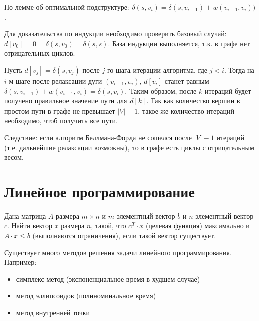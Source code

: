 \documentclass[11pt]{article}
\begin{document}
По лемме об оптимальной подструктуре: $\delta(s, v_i) = \delta(s, v_{i-1}) + w(v_{i-1}, v_i))$.

Для доказательства по индукции необходимо проверить базовый случай: $d[v_0] = 0 = \delta(s, v_0) = \delta(s, s)$. База индукции выполняется, т.к. в графе нет отрицательных циклов.

Пусть $d[v_j] = \delta(s, v_j)$ после $j$-го шага итерации алгоритма, где $j < i$. Тогда на $i$-м шаге после релаксации дуги $(v_{i-1}, v_i)$, $d[v_i]$ станет равным $\delta(s, v_{i-1}) + w(v_{i-1}, v_i) = \delta(s, v_i)$. Таким образом, после $k$ итераций будет получено правильное значение пути для $d[k]$. Так как количество вершин в простом пути в графе не превышает $|V|-1$, такое же количество итераций необходимо, чтоб получить все пути.

Следствие: если алгоритм Беллмана-Форда не сошелся после $|V|-1$ итераций (т.е. дальнейшие релаксации возможны), то в графе есть циклы с отрицательным весом.

\section{Линейное программирование}
Дана матрица $A$ размера $m \times n$ и $m$-элементный вектор $b$ и $n$-элементный вектор $c$. Найти вектор $x$ размера $n$, такой, что $c^{T} \cdot x$ (целевая функция) максимально и $A\cdot x \leqslant b$ (выполняются ограничения), если такой вектор существует.

Существует много методов решения задачи линейного программирования. Например:
\begin{itemize}
\item симплекс-метод (экспоненциальное время в худшем случае)
\item метод эллипсоидов (полиноминальное время) 
\item метод внутренней точки
\end{itemize}
\end{document}
